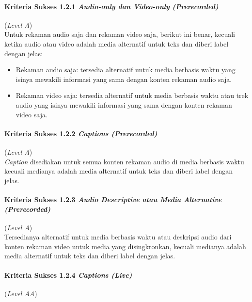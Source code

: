 \paragraph{Kriteria Sukses 1.2.1 \textit{Audio-only dan Video-only (Prerecorded)}}
\label{subsec:kriteria_1.2.1}
(\textit{Level A}) \\

Untuk rekaman audio saja dan rekaman video saja, berikut ini benar, kecuali ketika audio atau video adalah media alternatif untuk teks dan diberi label dengan jelas: 
\begin{itemize}
	\item Rekaman audio saja: tersedia alternatif untuk media berbasis waktu yang isinya mewakili informasi yang sama dengan konten rekaman audio saja.
	\item Rekaman video saja: tersedia alternatif untuk media berbasis waktu atau trek audio yang isinya mewakili informasi yang sama dengan konten rekaman video saja.
\end{itemize}

\paragraph{Kriteria Sukses 1.2.2 \textit{Captions (Prerecorded)}}
\label{subsec:kriteria_1.2.2}
(\textit{Level A}) \\

\textit{Caption} disediakan untuk semua konten rekaman audio di media berbasis waktu kecuali medianya adalah media alternatif untuk teks dan diberi label dengan jelas.


\paragraph{Kriteria Sukses 1.2.3 \textit{Audio Descriptive atau Media Alternative (Prerecorded)}}
\label{subsec:kriteria_1.2.3}
(\textit{Level A}) \\

Tersedianya alternatif untuk media berbasis waktu atau deskripsi audio dari konten rekaman video untuk media yang disingkronkan, kecuali medianya adalah media alternatif untuk teks dan diberi label dengan jelas.


\paragraph{Kriteria Sukses 1.2.4 \textit{Captions (Live)}}
\label{subsec:kriteria_1.2.4}
(\textit{Level AA}) \\


